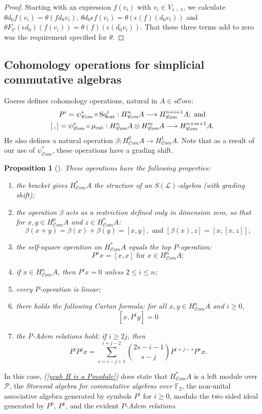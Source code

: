 \documentclass[11pt]{amsart}
\theoremstyle{plain}
\newtheorem{prop}[thm]{Proposition}
\theoremstyle{definition}
\renewcommand{\to}{\longrightarrow}
\newcommand{\scrL}{\mathscr{L}}
\newcommand{\scrC}{\mathscr{C}}
\newcommand{\calP}{\mathcal{P}}
\newcommand{\calC}{\mathcal{C}}
\theoremstyle{plain}
\newcommand{\Palg}{{\calP}}
\newcommand{\LieOperad}{{\scrL}}
\newcommand{\ExtCohOp}{\textup{Sq}_\textup{ext}}
\newcommand{\ExtCohProd}{\mu_\textup{ext}}
\newcommand{\F}{\mathbb{F}}
\newcommand{\algs}{{\scrC\!\textit{om}}}
\begin{document}
\begin{Constructing (co)homotopy operations}
\begin{proof}
Starting with an expression $f(v_i)$ with $v_i\in V_{s-1}$, we calculate $\theta d_0 f(v_i)=\theta (fd_0v_i)$, $\theta d_0\epsilon f(v_i)=\theta (\epsilon (f)(d_0v_i))$ and $\theta F_{\calC}(\epsilon d_0)(f(v_i))=\theta(f)(\epsilon(d_0v_i))$. That these three terms add to zero was the requirement specified for $\theta$.
\end{proof}



\subsection{Cohomology operations for simplicial commutative algebras}\label{The example of simplicial commutative F2-algebras}
Goerss \cite[\S5]{MR1089001} defines cohomology operations, natural in $A\in s \algs$:
\begin{gather*}
P^i=\psi^*_{\algs}\circ\ExtCohOp^i:H^n_{\algs}A\to H_{\algs}^{n+i+1}A;\textup{ and}\\
[\,,]=\psi^*_{\algs}\circ\ExtCohProd :H_{\algs}^nA\otimes H_{\algs}^mA\to H_{\algs}^{n+m+1}A.
\end{gather*}
He also defines a natural operation $\beta:H_{\algs}^0A\to H_{\algs}^1A$. Note that as a result of our use of $\psi^*_{\algs}$, these operations have a grading shift.
\begin{prop}[{\cite[\S5]{MR1089001}}]\label{omnibus on coh of simp algs}These operations have the following properties:
\begin{enumerate}
\item the bracket gives $H^*_{\algs}A$ the structure of an $S(\LieOperad)$-algebra (with grading shift);
\item the operation $\beta$ acts as a restriction defined only in dimension zero, so that for $x,y\in H^0_{\algs}A$ and $z\in H^*_{\algs}A$:
\[\beta(x+y)=\beta(x)+\beta(y)=[x,y],\text{\ \ and \ }[\beta(x),z]=[x,[x,z]];\]
\item the self-square operation on $H^*_{\algs}A$ equals the top $P$-operation:\[P^nx=[x,x]\text{\ \ for $x\in H^n_{\algs}A$};\]
\item \label{P unstable vanishing} if $x\in H^n_{\algs}A$, then $P^ix=0$ unless $2\leq i\leq n$;
\item every $P$-operation is linear;
\item there holds the following \emph{Cartan formula}:  for all $x,y\in   H^n_{\algs}A$ and $i\geq0$,
\[[x,P^iy]=0\]
\item \label{yeah H is a Pmodule}the \emph{$P$-Adem relations} hold: if $i\geq 2j$, then
\[P^iP^jx=\sum_{s=i-j+1}^{i+j-2}{2s-i-1\choose s-j}P^{i+j-s}P^sx.\]
\end{enumerate}
\end{prop}
In this case, \emph{(\ref{yeah H is a Pmodule})} does state that $H^*_{\algs}A$ is a left module over $\Palg$, the \emph{Steenrod algebra for commutative algebras over $\F_2$}, the non-unital associative algebra generated by symbols $P^i$ for $i\geq0$, modulo the two sided ideal generated by $P^0$, $P^1$, and the evident \emph{$P$-Adem relations}.



\end{Constructing (co)homotopy operations}
\end{document}
